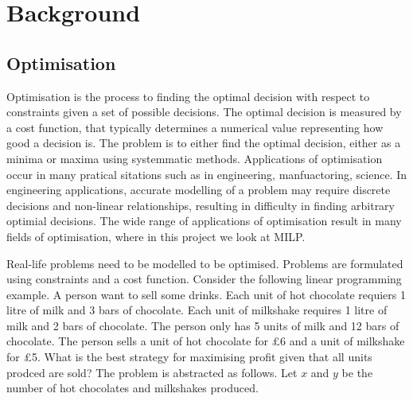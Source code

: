 \chapter{Background}

\section{Optimisation}

Optimisation is the process to finding the optimal decision with respect to constraints given a set of possible decisions. The optimal decision is measured by a cost function, that typically determines a numerical value representing how good a decision is. The problem is to either find the optimal decision, either as a minima or maxima using systemmatic methods. Applications of optimisation occur in many pratical sitations such as in engineering, manfuactoring, science. In engineering applications, accurate modelling of a problem may require discrete decisions and non-linear relationships, resulting in difficulty in finding arbitrary optimial decisions. The wide range of applications of optimisation result in  many fields of optimisation, where in this project we look at MILP.
\begin{center}
\end{center}
Real-life problems need to be modelled to be optimised. Problems are formulated using constraints and a cost function. Consider the following linear programming example. A person want to sell some drinks. Each unit of hot chocolate requiers 1 litre of milk and 3 bars of chocolate. Each unit of milkshake requires 1 litre of milk and 2 bars of chocolate. The person only has 5 units of milk and 12 bars of chocolate. The person sells a unit of hot chocolate for £6 and a unit of milkshake for £5. What is the best strategy for maximising profit given that all units prodced are sold? The problem is abstracted as follows. Let $x$ and $y$ be the number of hot chocolates and milkshakes produced.
